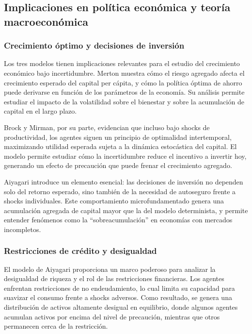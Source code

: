\documentclass[a4paper,12pt]{article}
\begin{document}
\subsection{Implicaciones en política económica y teoría macroeconómica}

\subsubsection{Crecimiento óptimo y decisiones de inversión}

Los tres modelos tienen implicaciones relevantes para el estudio del crecimiento económico bajo incertidumbre. Merton muestra cómo el riesgo agregado afecta el crecimiento esperado del capital per cápita, y cómo la política óptima de ahorro puede derivarse en función de los parámetros de la economía. Su análisis permite estudiar el impacto de la volatilidad sobre el bienestar y sobre la acumulación de capital en el largo plazo.

Brock y Mirman, por su parte, evidencian que incluso bajo shocks de productividad, los agentes siguen un principio de optimalidad intertemporal, maximizando utilidad esperada sujeta a la dinámica estocástica del capital. El modelo permite estudiar cómo la incertidumbre reduce el incentivo a invertir hoy, generando un efecto de precaución que puede frenar el crecimiento agregado.

Aiyagari introduce un elemento esencial: las decisiones de inversión no dependen solo del retorno esperado, sino también de la necesidad de autoseguro frente a shocks individuales. Este comportamiento microfundamentado genera una acumulación agregada de capital mayor que la del modelo determinista, y permite entender fenómenos como la “sobreacumulación” en economías con mercados incompletos.

\subsubsection{Restricciones de crédito y desigualdad}

El modelo de Aiyagari proporciona un marco poderoso para analizar la desigualdad de riqueza y el rol de las restricciones financieras. Los agentes enfrentan restricciones de no endeudamiento, lo cual limita su capacidad para suavizar el consumo frente a shocks adversos. Como resultado, se genera una distribución de activos altamente desigual en equilibrio, donde algunos agentes acumulan activos por encima del nivel de precaución, mientras que otros permanecen cerca de la restricción.
\end{document}
